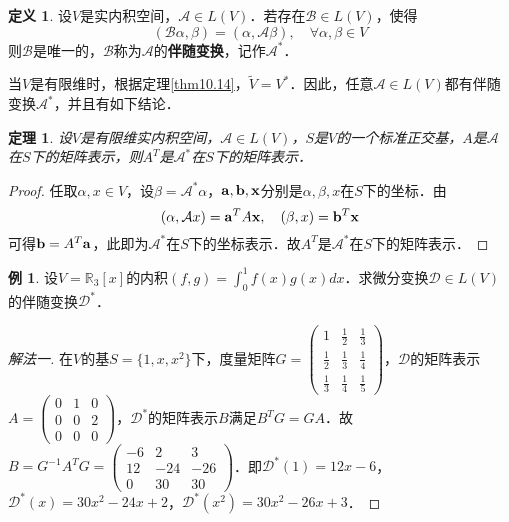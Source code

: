 \documentclass[a4paper,fontset=windows]{ctexbook}
\newtheorem{theorem}{定理}[chapter]
\theoremstyle{definition}
\newtheorem{definition}{定义}[chapter]
\newtheorem{example}{例}[chapter]
\begin{document}
\begin{definition}
设$V$是实内积空间，$\mathcal{A}\in L(V)$．若存在$\mathcal{B}\in L(V)$，使得
$$(\mathcal{B}\alpha,\beta)=(\alpha,\mathcal{A}\beta),\quad\forall\alpha,\beta\in V$$
则$\mathcal{B}$是唯一的，$\mathcal{B}$称为$\mathcal{A}$的{\bf 伴随变换}，记作$\mathcal{A}^*$．
\end{definition}

当$V$是有限维时，根据定理\ref{thm10.14}，$\widetilde{V}=V^*$．因此，任意$\mathcal{A}\in L(V)$都有伴随变换$\mathcal{A}^*$，并且有如下结论．

\begin{theorem}
设$V$是有限维实内积空间，$\mathcal{A}\in L(V)$，$S$是$V$的一个标准正交基，$A$是$\mathcal{A}$在$S$下的矩阵表示，则$A^T$是$\mathcal{A}^*$在$S$下的矩阵表示．
\end{theorem}

\begin{proof}
任取$\alpha,x\in V$，设$\beta=\mathcal{A}^*\alpha$，${\bf a,b,x}$分别是$\alpha,\beta,x$在$S$下的坐标．由
$$(\alpha,\mathcal{A}x)={\bf a}^TA{\bf x},\quad(\beta,x)={\bf b}^T{\bf x}$$
可得${\bf b}=A^T{\bf a}$，此即为$\mathcal{A}^*$在$S$下的坐标表示．故$A^T$是$\mathcal{A}^*$在$S$下的矩阵表示．
\end{proof}

\begin{example}
设$V=\mathbb{R}_3[x]$的内积$(f,g)=\int_0^1f(x)g(x)dx$．求微分变换$\mathcal{D}\in L(V)$的伴随变换$\mathcal{D}^*$．
\end{example}

\begin{proof}[解法一]
在$V$的基$S=\{1,x,x^2\}$下，度量矩阵$G=\begin{pmatrix}1&\frac{1}{2}&\frac{1}{3} \\ \frac{1}{2}&\frac{1}{3}&\frac{1}{4} \\ \frac{1}{3}&\frac{1}{4}&\frac{1}{5}\end{pmatrix}$，$\mathcal{D}$的矩阵表示$A=\begin{pmatrix}0&1&0 \\ 0&0&2 \\ 0&0&0\end{pmatrix}$，$\mathcal{D}^*$的矩阵表示$B$满足$B^TG=GA$．故$B=G^{-1}A^TG=\begin{pmatrix}-6&2&3 \\ 12&-24&-26 \\ 0&30&30\end{pmatrix}$．即$\mathcal{D}^*(1)=12x-6$，$\mathcal{D}^*(x)=30x^2-24x+2$，$\mathcal{D}^*(x^2)=30x^2-26x+3$．
\end{proof}
\end{document}
